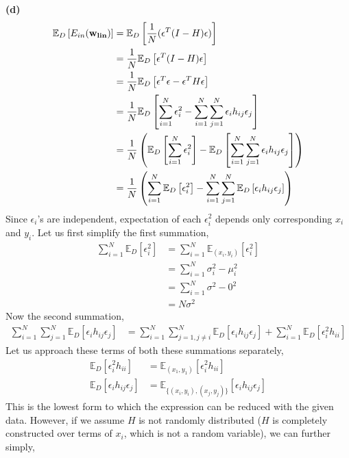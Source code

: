 \documentclass[12pt]{article}
\newcommand{\e}[0]{\epsilon}
\begin{document}
\textbf{(d)}
\begin{align} \nonumber
    \mathbb{E}_{D}\left[ E_{in}({\bf w_{lin}})\right] & = \mathbb{E}_{D} \left[ \frac{1}{N} (\e^T(I-H)\e) \right] \\ \nonumber
    & = \frac{1}{N} \mathbb{E}_{D} \left[  \e^T(I-H)\e \right] \\ \nonumber
    & = \frac{1}{N} \mathbb{E}_{D} \left[  \e^T\e - \e^TH\e \right] \\ \nonumber
    & = \frac{1}{N} \mathbb{E}_{D} \left[  \sum_{i = 1}^N\e_i^2 - \sum_{i = 1}^N\sum_{j=1}^N\e_ih_{ij}\e_j \right] \\ \nonumber
    & = \frac{1}{N} \left( \mathbb{E}_{D} \left[  \sum_{i = 1}^N\e_i^2\right] - \mathbb{E}_{D}\left[\sum_{i = 1}^N\sum_{j=1}^N\e_ih_{ij}\e_j \right]\right) \\ 
    & = \frac{1}{N} \left( \sum_{i = 1}^N\mathbb{E}_{D} \left[  \e_i^2\right] - \sum_{i = 1}^N\sum_{j=1}^N \mathbb{E}_{D}\left[\e_ih_{ij}\e_j \right]\right) 
\end{align}
Since \(\e_i\)'s are independent, expectation of each \(\e_i^2\) depends only corresponding \(x_i\) and \(y_i\).
Let us first simplify the first summation,
\begin{align} \nonumber
    \sum_{i = 1}^N\mathbb{E}_{D} \left[  \e_i^2\right] & = \sum_{i = 1}^N\mathbb{E}_{(x_i,y_i)} \left[  \e_i^2\right] \\ \nonumber
    & = \sum_{i = 1}^N \sigma_i^2 - \mu_i^2\\ \nonumber
    & = \sum_{i = 1}^N \sigma^2 - 0^2\\ 
    & = N\sigma^2
\end{align}
Now the second summation,
\begin{align*}
    \sum_{i = 1}^N\sum_{j=1}^N \mathbb{E}_{D}\left[\e_ih_{ij}\e_j \right] & = \sum_{i = 1}^N\sum_{j=1,j\neq i}^N \mathbb{E}_{D}\left[\e_ih_{ij}\e_j \right] + \sum_{i = 1}^N \mathbb{E}_{D}\left[\e_i^2h_{ii} \right]
\end{align*}
Let us approach these terms of both these summations separately,
\begin{align*}
    \mathbb{E}_{D}\left[\e_i^2h_{ii} \right] & = \mathbb{E}_{(x_1,y_1)}\left[\e_i^2h_{ii} \right]\\
    \mathbb{E}_{D}\left[\e_ih_{ij}\e_j \right] & = \mathbb{E}_{\{(x_i,y_i),(x_j,y_j)\}}\left[\e_ih_{ij}\e_j \right]
\end{align*}
This is the lowest form to which the expression can be reduced with the given data. However, if we assume \(H\) is not randomly distributed (\(H\) is completely constructed over terms of \(x_i\), which is not a random variable), we can further simply,
\end{document}
